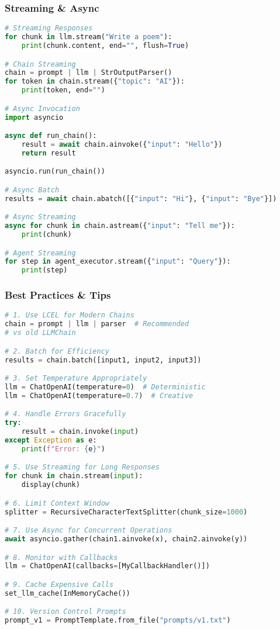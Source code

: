 \begin{frame}[fragile]\frametitle{Streaming \& Async}
\begin{lstlisting}[language=python,basicstyle=\tiny]
# Streaming Responses
for chunk in llm.stream("Write a poem"):
    print(chunk.content, end="", flush=True)

# Chain Streaming
chain = prompt | llm | StrOutputParser()
for token in chain.stream({"topic": "AI"}):
    print(token, end="")

# Async Invocation
import asyncio

async def run_chain():
    result = await chain.ainvoke({"input": "Hello"})
    return result

asyncio.run(run_chain())

# Async Batch
results = await chain.abatch([{"input": "Hi"}, {"input": "Bye"}])

# Async Streaming
async for chunk in chain.astream({"input": "Tell me"}):
    print(chunk)

# Agent Streaming
for step in agent_executor.stream({"input": "Query"}):
    print(step)
\end{lstlisting}
\end{frame}

\begin{frame}[fragile]\frametitle{Best Practices \& Tips}
\begin{lstlisting}[language=python,basicstyle=\tiny]
# 1. Use LCEL for Modern Chains
chain = prompt | llm | parser  # Recommended
# vs old LLMChain

# 2. Batch for Efficiency
results = chain.batch([input1, input2, input3])

# 3. Set Temperature Appropriately
llm = ChatOpenAI(temperature=0)  # Deterministic
llm = ChatOpenAI(temperature=0.7)  # Creative

# 4. Handle Errors Gracefully
try:
    result = chain.invoke(input)
except Exception as e:
    print(f"Error: {e}")

# 5. Use Streaming for Long Responses
for chunk in chain.stream(input):
    display(chunk)

# 6. Limit Context Window
splitter = RecursiveCharacterTextSplitter(chunk_size=1000)

# 7. Use Async for Concurrent Operations
await asyncio.gather(chain1.ainvoke(x), chain2.ainvoke(y))

# 8. Monitor with Callbacks
llm = ChatOpenAI(callbacks=[MyCallbackHandler()])

# 9. Cache Expensive Calls
set_llm_cache(InMemoryCache())

# 10. Version Control Prompts
prompt_v1 = PromptTemplate.from_file("prompts/v1.txt")
\end{lstlisting}
\end{frame}

